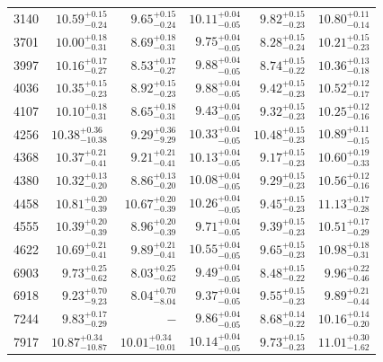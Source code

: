 \begin{table}
\begin{tabular}{|r r r r r r|}
 3140 & $10.59_{-0.24}^{+0.15}$ & $ 9.65_{-0.24}^{+0.15}$ & $10.11_{-0.05}^{+0.04}$ & $ 9.82_{-0.23}^{+0.15}$ & $10.80_{-0.14}^{+0.11}$ \\
 3701 & $10.00_{-0.31}^{+0.18}$ & $ 8.69_{-0.31}^{+0.18}$ & $ 9.75_{-0.05}^{+0.04}$ & $ 8.28_{-0.24}^{+0.15}$ & $10.21_{-0.23}^{+0.15}$ \\
 3997 & $10.16_{-0.27}^{+0.17}$ & $ 8.53_{-0.27}^{+0.17}$ & $ 9.88_{-0.05}^{+0.04}$ & $ 8.74_{-0.22}^{+0.15}$ & $10.36_{-0.18}^{+0.13}$ \\
 4036 & $10.35_{-0.23}^{+0.15}$ & $ 8.92_{-0.23}^{+0.15}$ & $ 9.88_{-0.05}^{+0.04}$ & $ 9.42_{-0.23}^{+0.15}$ & $10.52_{-0.17}^{+0.12}$ \\
 4107 & $10.10_{-0.31}^{+0.18}$ & $ 8.65_{-0.31}^{+0.18}$ & $ 9.43_{-0.05}^{+0.04}$ & $ 9.32_{-0.23}^{+0.15}$ & $10.25_{-0.16}^{+0.12}$ \\
 4256 & $10.38_{-10.38}^{+0.36}$ & $ 9.29_{-9.29}^{+0.36}$ & $10.33_{-0.05}^{+0.04}$ & $10.48_{-0.23}^{+0.15}$ & $10.89_{-0.15}^{+0.11}$ \\
 4368 & $10.37_{-0.41}^{+0.21}$ & $ 9.21_{-0.41}^{+0.21}$ & $10.13_{-0.05}^{+0.04}$ & $ 9.17_{-0.23}^{+0.15}$ & $10.60_{-0.33}^{+0.19}$ \\
 4380 & $10.32_{-0.20}^{+0.13}$ & $ 8.86_{-0.20}^{+0.13}$ & $10.08_{-0.05}^{+0.04}$ & $ 9.29_{-0.23}^{+0.15}$ & $10.56_{-0.16}^{+0.12}$ \\
 4458 & $10.81_{-0.39}^{+0.20}$ & $10.67_{-0.39}^{+0.20}$ & $10.26_{-0.05}^{+0.04}$ & $ 9.45_{-0.23}^{+0.15}$ & $11.13_{-0.28}^{+0.17}$ \\
 4555 & $10.39_{-0.39}^{+0.20}$ & $ 8.96_{-0.39}^{+0.20}$ & $ 9.71_{-0.05}^{+0.04}$ & $ 9.39_{-0.23}^{+0.15}$ & $10.51_{-0.29}^{+0.17}$ \\
 4622 & $10.69_{-0.41}^{+0.21}$ & $ 9.89_{-0.41}^{+0.21}$ & $10.55_{-0.05}^{+0.04}$ & $ 9.65_{-0.23}^{+0.15}$ & $10.98_{-0.31}^{+0.18}$ \\
 6903 & $ 9.73_{-0.62}^{+0.25}$ & $ 8.03_{-0.62}^{+0.25}$ & $ 9.49_{-0.05}^{+0.04}$ & $ 8.48_{-0.22}^{+0.15}$ & $ 9.96_{-0.46}^{+0.22}$ \\
 6918 & $ 9.23_{-9.23}^{+0.70}$ & $ 8.04_{-8.04}^{+0.70}$ & $ 9.37_{-0.05}^{+0.04}$ & $ 9.55_{-0.23}^{+0.15}$ & $ 9.89_{-0.44}^{+0.21}$ \\
 7244 & $ 9.83_{-0.29}^{+0.17}$ & $    -                $ & $ 9.86_{-0.05}^{+0.04}$ & $ 8.68_{-0.22}^{+0.14}$ & $10.16_{-0.20}^{+0.14}$ \\
 7917 & $10.87_{-10.87}^{+0.34}$ & $10.01_{-10.01}^{+0.34}$ & $10.14_{-0.05}^{+0.04}$ & $ 9.73_{-0.23}^{+0.15}$ & $11.01_{-1.62}^{+0.30}$ \\

\end{tabular}
\end{table}
